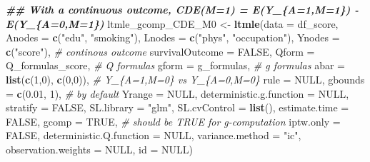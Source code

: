 \documentclass[
]{book}
\newenvironment{Shaded}{\begin{snugshade}}{\end{snugshade}}
\newcommand{\AttributeTok}[1]{\textcolor[rgb]{0.13,0.29,0.53}{#1}}
\newcommand{\CommentTok}[1]{\textcolor[rgb]{0.56,0.35,0.01}{\textit{#1}}}
\newcommand{\ConstantTok}[1]{\textcolor[rgb]{0.56,0.35,0.01}{#1}}
\newcommand{\DecValTok}[1]{\textcolor[rgb]{0.00,0.00,0.81}{#1}}
\newcommand{\DocumentationTok}[1]{\textcolor[rgb]{0.56,0.35,0.01}{\textbf{\textit{#1}}}}
\newcommand{\FloatTok}[1]{\textcolor[rgb]{0.00,0.00,0.81}{#1}}
\newcommand{\FunctionTok}[1]{\textcolor[rgb]{0.13,0.29,0.53}{\textbf{#1}}}
\newcommand{\NormalTok}[1]{#1}
\newcommand{\OtherTok}[1]{\textcolor[rgb]{0.56,0.35,0.01}{#1}}
\newcommand{\StringTok}[1]{\textcolor[rgb]{0.31,0.60,0.02}{#1}}
\begin{document}
\begin{Shaded}
\begin{Highlighting}[]
\DocumentationTok{\#\# With a continuous outcome, CDE(M=1) = E(Y\_\{A=1,M=1\}) {-} E(Y\_\{A=0,M=1\})}
\NormalTok{ltmle\_gcomp\_CDE\_M0 }\OtherTok{\textless{}{-}} \FunctionTok{ltmle}\NormalTok{(}\AttributeTok{data =}\NormalTok{ df\_score,}
                            \AttributeTok{Anodes =} \FunctionTok{c}\NormalTok{(}\StringTok{"edu"}\NormalTok{, }\StringTok{"smoking"}\NormalTok{),}
                            \AttributeTok{Lnodes =} \FunctionTok{c}\NormalTok{(}\StringTok{"phys"}\NormalTok{, }\StringTok{"occupation"}\NormalTok{),}
                            \AttributeTok{Ynodes =} \FunctionTok{c}\NormalTok{(}\StringTok{"score"}\NormalTok{), }\CommentTok{\# continous outcome}
                            \AttributeTok{survivalOutcome =} \ConstantTok{FALSE}\NormalTok{,}
                            \AttributeTok{Qform =}\NormalTok{ Q\_formulas\_score, }\CommentTok{\# Q formulas}
                            \AttributeTok{gform =}\NormalTok{ g\_formulas, }\CommentTok{\# g formulas}
                            \AttributeTok{abar =} \FunctionTok{list}\NormalTok{(}\FunctionTok{c}\NormalTok{(}\DecValTok{1}\NormalTok{,}\DecValTok{0}\NormalTok{),}
                                        \FunctionTok{c}\NormalTok{(}\DecValTok{0}\NormalTok{,}\DecValTok{0}\NormalTok{)), }\CommentTok{\# Y\_\{A=1,M=0\} vs Y\_\{A=0,M=0\}}
                            \AttributeTok{rule =} \ConstantTok{NULL}\NormalTok{,}
                            \AttributeTok{gbounds =} \FunctionTok{c}\NormalTok{(}\FloatTok{0.01}\NormalTok{, }\DecValTok{1}\NormalTok{), }\CommentTok{\# by default}
                            \AttributeTok{Yrange =} \ConstantTok{NULL}\NormalTok{,}
                            \AttributeTok{deterministic.g.function =} \ConstantTok{NULL}\NormalTok{,}
                            \AttributeTok{stratify =} \ConstantTok{FALSE}\NormalTok{,}
                            \AttributeTok{SL.library =} \StringTok{"glm"}\NormalTok{,}
                            \AttributeTok{SL.cvControl =} \FunctionTok{list}\NormalTok{(),}
                            \AttributeTok{estimate.time =} \ConstantTok{FALSE}\NormalTok{,}
                            \AttributeTok{gcomp =} \ConstantTok{TRUE}\NormalTok{, }\CommentTok{\# should be TRUE for g{-}computation}
                            \AttributeTok{iptw.only =} \ConstantTok{FALSE}\NormalTok{,}
                            \AttributeTok{deterministic.Q.function =} \ConstantTok{NULL}\NormalTok{,}
                            \AttributeTok{variance.method =} \StringTok{"ic"}\NormalTok{,}
                            \AttributeTok{observation.weights =} \ConstantTok{NULL}\NormalTok{,}
                            \AttributeTok{id =} \ConstantTok{NULL}\NormalTok{)}
\end{Highlighting}
\end{Shaded}
\end{document}
